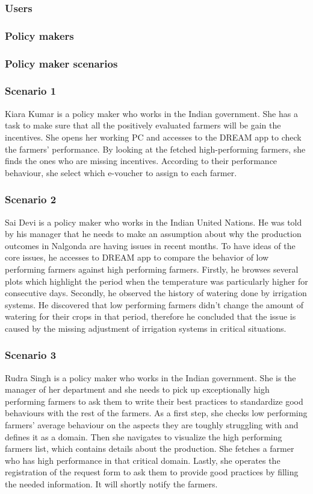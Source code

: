 \subsubsection{Users}
\label{sect:users_requirements}




\subsubsection{Policy makers}
\subsubsection*{Policy maker scenarios}
\subsubsection*{Scenario 1}
Kiara Kumar is a policy maker who works in the Indian government. She has a task to make sure that all the positively evaluated farmers will be gain the incentives. She opens her working PC and accesses to the DREAM app to check the farmers' performance. By looking at the fetched high-performing farmers, she finds the ones who are missing incentives. According to their performance behaviour, she select which e-voucher to assign to each farmer.
\subsubsection*{Scenario 2}
Sai Devi is a policy maker who works in the Indian United Nations. He was told by his manager that he needs to make an assumption about why the production outcomes in Nalgonda are having issues in recent months. To have ideas of the core issues, he accesses to DREAM app to compare the behavior of low performing farmers against high performing farmers. Firstly, he browses several plots which highlight the period when the temperature was particularly higher for consecutive days. Secondly, he observed the history of watering done by irrigation systems. He discovered that low performing farmers didn't change the amount of watering for their crops in that period, therefore he concluded that the issue is caused by the missing adjustment of irrigation systems in critical situations.   
\subsubsection*{Scenario 3}
Rudra Singh is a policy maker who works in the Indian government. She is the manager of her department and she needs to pick up exceptionally high performing farmers to ask them to write their best practices to standardize good behaviours with the rest of the farmers. As a first step, she checks low performing farmers' average behaviour on the aspects they are toughly struggling with and defines it as a domain. Then she navigates to visualize the high performing farmers list, which contains details about the production. She fetches a farmer who has high performance in that critical domain. Lastly, she operates the registration of the request form to ask them to provide good practices by filling the needed information. It will shortly notify the farmers. 
